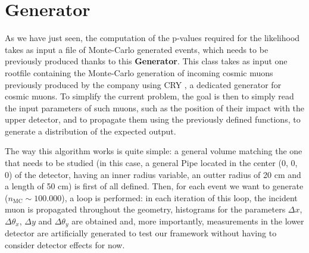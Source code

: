 \documentclass[a4paper, 11pt]{report}
\begin{document}
\begin{itemize}

    

\end{itemize}

\section{Generator} \label{sec:Generator}

As we have just seen, the computation of the p-values required for the likelihood takes as input a file of Monte-Carlo generated events, which needs to be previously produced thanks to this \textbf{Generator}. This class takes as input one rootfile containing the Monte-Carlo generation of incoming cosmic muons previously produced by the company using CRY \cite{CRY}, a dedicated generator for cosmic muons. To simplify the current problem, the goal is then to simply read the input parameters of such muons, such as the position of their impact with the upper detector, and to propagate them using the previously defined functions, to generate a distribution of the expected output.

The way this algorithm works is quite simple: a general volume matching the one that needs to be studied (in this case, a general Pipe located in the center (0, 0, 0) of the detector, having an inner radius variable, an outter radius of 20 cm and a length of 50 cm) is first of all defined. Then, for each event we want to generate ($n_{\text{MC}} \sim 100.000$), a loop is performed: in each iteration of this loop, the incident muon is propagated throughout the geometry, histograms for the parameters $\Delta x$, $\Delta \theta_x$, $\Delta y$ and $\Delta \theta_y$ are obtained and, more importantly, measurements in the lower detector are artificially generated to test our framework without having to consider detector effects for now.
\end{document}
